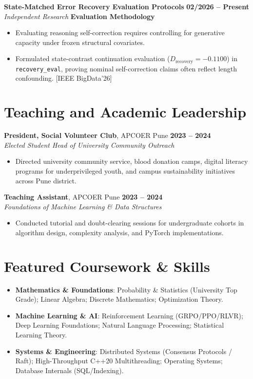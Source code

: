 \documentclass[10pt,letterpaper]{article}
\begin{document}
\vspace{3pt}

\textbf{State-Matched Error Recovery Evaluation Protocols} \hfill \textbf{02/2026 -- Present} \\
\textit{Independent Research} \hfill \textcolor{accent}{\textbf{Evaluation Methodology}}
\begin{itemize}
    \item Evaluating reasoning self-correction requires controlling for generative capacity under frozen structural covariates.
    \item Formulated state-contrast continuation evaluation ($D_{\text{recovery}} = -0.1100$) in \texttt{recovery\_eval}, proving nominal self-correction claims often reflect length confounding. [IEEE BigData'26]
\end{itemize}

\section*{Teaching and Academic Leadership}
\textbf{President, Social Volunteer Club}, APCOER Pune \hfill \textbf{2023 -- 2024} \\
\textit{Elected Student Head of University Community Outreach}
\begin{itemize}
    \item Directed university community service, blood donation camps, digital literacy programs for underprivileged youth, and campus sustainability initiatives across Pune district.
\end{itemize}
\vspace{2pt}
\textbf{Teaching Assistant}, APCOER Pune \hfill \textbf{2023 -- 2024} \\
\textit{Foundations of Machine Learning \& Data Structures}
\begin{itemize}
    \item Conducted tutorial and doubt-clearing sessions for undergraduate cohorts in algorithm design, complexity analysis, and PyTorch implementations.
\end{itemize}

\section*{Featured Coursework \& Skills}
\begin{itemize}
    \item \textbf{Mathematics \& Foundations}: Probability \& Statistics (University Top Grade); Linear Algebra; Discrete Mathematics; Optimization Theory.
    \item \textbf{Machine Learning \& AI}: Reinforcement Learning (GRPO/PPO/RLVR); Deep Learning Foundations; Natural Language Processing; Statistical Learning Theory.
    \item \textbf{Systems \& Engineering}: Distributed Systems (Consensus Protocols / Raft); High-Throughput C++20 Multithreading; Operating Systems; Database Internals (SQL/Indexing).
\end{itemize}
\end{document}
